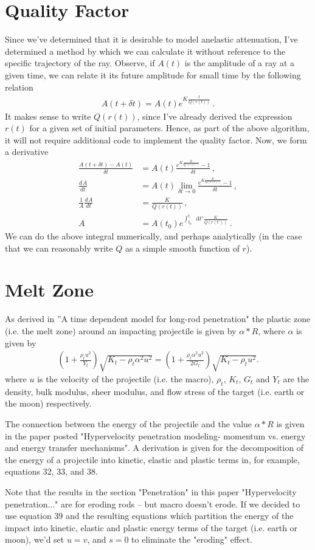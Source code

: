 \documentclass{article}
\newcommand*\diff{\mathop{}\!\mathrm{d}}
\newcommand*\f[2]{\frac{#1}{#2}}
\newcommand*\td[3]{\frac{d^{#3}#1}{d #2^{#3}}}
\begin{document}
\section{Quality Factor}
Since we've determined that it is desirable to model anelastic attenuation, I've determined a method by which we can calculate it without reference to the specific trajectory of the ray. Observe, if $A(t)$ is the amplitude of a ray at a given time, we can relate it its future amplitude for small time by the following relation
\begin{align}
A(t+\delta t) = A(t)e^{K\f{t}{Q(r(t))}}\,.
\end{align}
It makes sense to write $Q(r(t))$, since I've already derived the expression $r(t)$ for a given set of initial parameters. Hence, as part of the above algorithm, it will not require additional code to implement the quality factor. Now, we form a derivative
\begin{align}
\f{A(t+\delta t)- A(t)}{\delta t} &= A(t)\f{e^{K\f{\delta t}{Q(r(t))}}-1}{\delta t}\,,\\
\td{A}{t}{}&= A(t)\lim_{\delta t\to 0}\f{e^{K\f{\delta t}{Q(r(t))}}-1}{\delta t}\,,\\
\f{1}{A}\td{A}{t}{}&= \f{K}{Q(r(t))}\,,\\
A &= A(t_0)e^{\int_{t_0}^t\diff t'\f{K}{Q(r(t'))}}\,.
\end{align}
We can do the above integral numerically, and perhaps analytically (in the case that we can reasonably write $Q$ as a simple smooth function of $r$).
\pagebreak
\section{Melt Zone}
As derived in ''A time dependent model for long-rod penetration" the plastic zone (i.e. the melt zone) around an impacting projectile is given by $\alpha*R$, where $\alpha$ is given by 
\begin{align}
(1+\frac{\rho_t u^2}{Y_t})\sqrt{K_t - \rho_t \alpha^2 u^2} = (1+\frac{\rho_t \alpha^2 u^2}{2G_t})\sqrt{K_t - \rho_t u^2}.
\end{align}
where $u$ is the velocity of the projectile (i.e. the macro), $\rho_t$, $K_t$, $G_t$ and $Y_t$ are the density, bulk modulus, sheer modulus, and flow stress of the target (i.e. earth or the moon) respectively.

The connection between the energy of the projectile and the value $\alpha*R$ is given in the paper posted "Hypervelocity penetration modeling- momentum vs. energy and energy transfer mechanisms". A derivation is given for the decomposition of the energy of a projectile into kinetic, elastic and plastic terms in, for example, equations 32, 33, and 38.

Note that the results in the section "Penetration" in this paper "Hypervelocity penetration..." are for eroding rods -- but macro doesn't erode.  If we decided to use equation 39 and the resulting equations which partition the energy of the impact into kinetic, elastic and plastic energy terms of the target (i.e. earth or moon), we'd set $u = v$, and $s = 0$ to eliminate the "eroding" effect.
\end{document}

